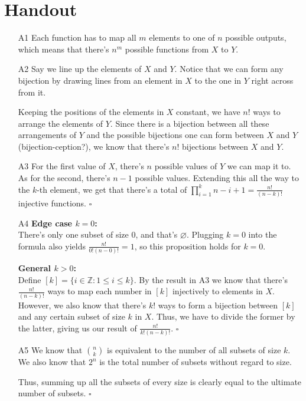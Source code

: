 \documentclass[12pt]{article}
\begin{document}
\section{Handout}\label{sec:handout}
\begin{itemize}
      \item[A1] Each function has to map all $m$ elements to one of $n$ possible outputs,
            which means that there's $\boxed{n^m}$ possible functions from $X$ to $Y$.
      \item[A2] Say we line up the elements of $X$ and $Y$.
            Notice that we can form any bijection by drawing lines from
            an element in $X$ to the one in $Y$ right across from it.

            Keeping the positions of the elements in $X$ constant, we have $n!$ ways to arrange
            the elements of $Y$.
            Since there is a bijection between all these arrangements of $Y$
            and the possible bijections one can form between $X$ and $Y$ (bijection-ception?),
            we know that there's $n!$ bijections between $X$ and $Y$.
      \item[A3] For the first value of $X$, there's $n$ possible values of $Y$ we can map it to.
            As for the second, there's $n-1$ possible values.
            Extending this all the way to the $k$-th element, we get that there's
            a total of $\prod_{i=1}^k n-i+1=\frac{n!}{(n-k)!}$ injective functions. $\square$
      \item[A4] \textbf{Edge case $k=0$:} \\
            There's only one subset of size 0, and that's $\varnothing$.
            Plugging $k=0$ into the formula also yields $\frac{n!}{0!(n-0)!}=1$, so this proposition holds for $k=0$.

            \textbf{General $k>0$:} \\
            Define $[k]=\{i \in \mathbb{Z}: 1 \le i \le k\}$.
            By the result in A3 we know that there's $\frac{n!}{(n-k)!}$ ways to map each
            number in $[k]$ injectively to elements in $X$.
            However, we also know that there's $k!$ ways to form a bijection between $[k]$
            and any certain subset of size $k$ in $X$.
            Thus, we have to divide the former by the latter, giving us our result of $\frac{n!}{k!(n-k)!}$. $\square$

      \item[A5] We know that $\binom{n}{k}$ is equivalent to the number of all subsets of size $k$.
            We also know that $2^n$ is the total number of subsets without regard to size.

            Thus, summing up all the subsets of every size is clearly equal to the ultimate number of subsets. $\square$
\end{itemize}
\end{document}
